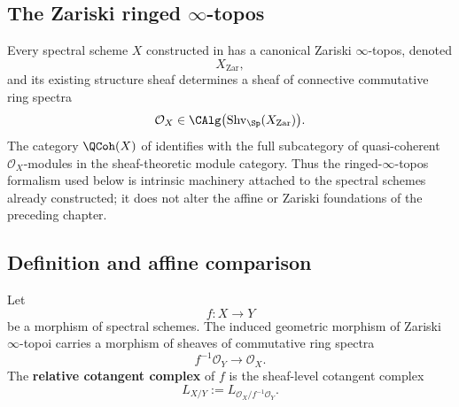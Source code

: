 \subsection{The Zariski ringed $\infty$-topos}

Every spectral scheme $X$ constructed in
 has a canonical Zariski
$\infty$-topos, denoted
\[
    X_{\mathrm{Zar}},
\]
and its existing structure sheaf determines a sheaf of connective
commutative ring spectra
\[
    \mathcal O_X
    \in
    \CAlg
    \bigl(
        \operatorname{Shv}_{\Sp}(X_{\mathrm{Zar}})
    \bigr).
\]
The category $\QCoh(X)$ of
 identifies with the full subcategory of
quasi-coherent $\mathcal O_X$-modules in the sheaf-theoretic module
category. Thus the ringed-$\infty$-topos formalism used below is intrinsic
machinery attached to the spectral schemes already constructed; it does
not alter the affine or Zariski foundations of the preceding chapter.

\subsection{Definition and affine comparison}

\begin{definition}
\label{def:global-relative-cotangent}
Let
\[
    f
    \colon
    X
    \longrightarrow
    Y
\]
be a morphism of spectral schemes. The induced geometric morphism of
Zariski $\infty$-topoi carries a morphism of sheaves of commutative ring
spectra
\[
    f^{-1}\mathcal O_Y
    \longrightarrow
    \mathcal O_X.
\]
The \textbf{relative cotangent complex} of $f$ is the sheaf-level
cotangent complex
\[
    L_{X/Y}
    :=
    L_{\mathcal O_X/f^{-1}\mathcal O_Y}.
\]
\end{definition}

